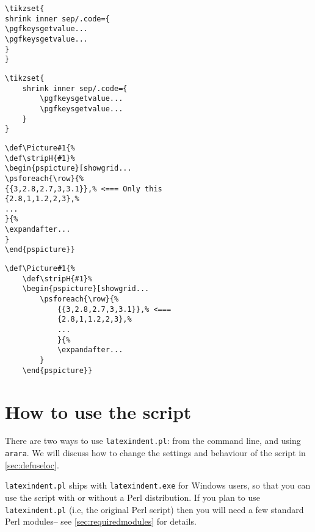 \begin{adjustwidth}{-2cm}{2cm}
	\begin{minipage}{.5\textwidth}
		\begin{lstlisting}[style=demo,caption={\lstinline!tikzset! before}]
\tikzset{
shrink inner sep/.code={
\pgfkeysgetvalue...
\pgfkeysgetvalue...
}
}
		\end{lstlisting}
	\end{minipage}%
	\begin{minipage}{.5\textwidth}
		\begin{lstlisting}[style=demo,caption={\lstinline!tikzset! after}]
\tikzset{
	shrink inner sep/.code={
		\pgfkeysgetvalue...
		\pgfkeysgetvalue...
	}
}
		\end{lstlisting}
	\end{minipage}
	\begin{minipage}{.5\textwidth}
		\begin{lstlisting}[style=demo,caption={\lstinline!pstricks! before}]
\def\Picture#1{%
\def\stripH{#1}%
\begin{pspicture}[showgrid...
\psforeach{\row}{%
{{3,2.8,2.7,3,3.1}},% <=== Only this 
{2.8,1,1.2,2,3},%
...
}{%
\expandafter...
}
\end{pspicture}}
		\end{lstlisting}
	\end{minipage}%
	\begin{minipage}{.5\textwidth}
		\begin{lstlisting}[style=demo,caption={\lstinline!pstricks! after},label={lst:pstricksafter}]
\def\Picture#1{%
	\def\stripH{#1}%
	\begin{pspicture}[showgrid...
		\psforeach{\row}{%
			{{3,2.8,2.7,3,3.1}},% <=== 
			{2.8,1,1.2,2,3},%
            ...
			}{%
			\expandafter...
		}
	\end{pspicture}}
		\end{lstlisting}
	\end{minipage}
\end{adjustwidth}
     
\section{How to use the script}
There are two ways to use \lstinline!latexindent.pl!: from the command line, 
and using \lstinline!arara!.  We will discuss how to change the settings and behaviour 
of the script in \cref{sec:defuseloc}.

\lstinline!latexindent.pl! ships with \lstinline!latexindent.exe! for Windows 
users, so that you can use the script with or without a Perl distribution. 
If you plan to use \lstinline!latexindent.pl! (i.e, the original Perl script) then you will 
need a few standard Perl modules-- see \vref{sec:requiredmodules} for details.

